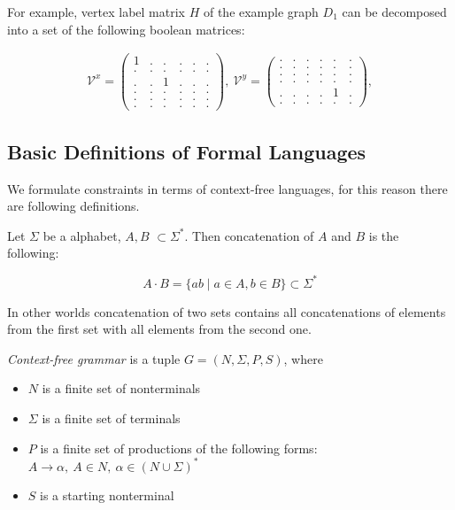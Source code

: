 For example, vertex label matrix $H$ of the example graph $D_1$ can be decomposed into a set of the following boolean matrices:

\begin{align*}
\mathcal{V}^x =
\begin{pmatrix}
    1 & . & . & . & . & .   \\
    . & . & . & . & . & . \\
    . & . & 1 & . & . & .\\
    . & . & . & . & . & . \\ 
    . & . & . & . & . & . \\ 
    . & . & . & . & . & .
\end{pmatrix},~ 
\mathcal{V}^y =
\begin{pmatrix}
    . & . & . & . & . & .   \\
    . & . & . & . & . & . \\
    . & . & . & . & . & .\\
    . & . & . & . & . & . \\ 
    . & . & . & . & 1 & . \\ 
    . & . & . & . & . & .
\end{pmatrix},  \label{eq:boolean_decomposition_of_graph}
\end{align*}

\subsection{Basic Definitions of Formal Languages}
We formulate constraints in terms of context-free languages, for this reason there are following definitions.

\begin{definition}
Let $\Sigma$ be a alphabet, $A, B$ $\subset \Sigma^*$. Then concatenation of $A$ and $B$ is the following:

$$A \cdot B = \{a b \mid a \in A, b \in B\} \subset \Sigma^*$$

In other worlds concatenation of two sets contains all concatenations of elements from the first set with all elements from the second one.

\end{definition}

\begin{definition}\emph{Context-free grammar} is a tuple $G=(N, \Sigma, P, S)$, where 
\begin{itemize}
    \item $N$ is a finite set of nonterminals
    \item $\Sigma$ is a finite set of terminals
    \item $P$ is a finite set of productions of the following forms: $A \to \alpha, ~A \in N,~ \alpha \in (N \cup \Sigma)^*$
    \item $S$ is a starting nonterminal
\end{itemize}
\end{definition}


